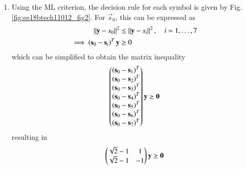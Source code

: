 \begin{enumerate}[label=\thesubsection.\arabic*.,ref=\thesubsection.\theenumi]
\item Using the ML criterion, the decision rule for each symbol is given by Fig. \ref{fig:ee18btech11012_fig2}.  For $\vec{s}_0$, this can be expressed as
\begin{align}
    \left\lVert\textbf{y}-\textbf{$s_{0}$}\right\rVert^2 & \le \left\lVert\textbf{y}-\textbf{$s_{i}$}\right\rVert^2, \quad i = 1,\dots,7\\
\implies \left(\mathbf{s}_0 - \mathbf{s}_i\right)^T \mathbf{y} &\ge 0\\
\end{align}
%
which can be simplified to obtain the matrix inequality
\begin{align}
\begin{pmatrix}
\left(\mathbf{s}_0 - \mathbf{s}_1\right)^T \\
\left(\mathbf{s}_0 - \mathbf{s}_2\right)^T\\
\left(\mathbf{s}_0 - \mathbf{s}_3\right)^T\\
\left(\mathbf{s}_0 - \mathbf{s}_4\right)^T\\
\left(\mathbf{s}_0 - \mathbf{s}_5\right)^T\\
\left(\mathbf{s}_0 - \mathbf{s}_6\right)^T\\
\left(\mathbf{s}_0 - \mathbf{s}_7\right)^T
\end{pmatrix}\mathbf{y} \succeq \mathbf{0} 
\end{align}
%
resulting in 
\begin{align}
\begin{pmatrix}\sqrt{2} - 1 & 1 \\ \sqrt{2} - 1 & -1\end{pmatrix} \mathbf{y} \succeq \mathbf{0}
\end{align}

\begin{figure}[!ht]

                \resizebox{\columnwidth}{!}{}


\end{figure}
\end{enumerate}
